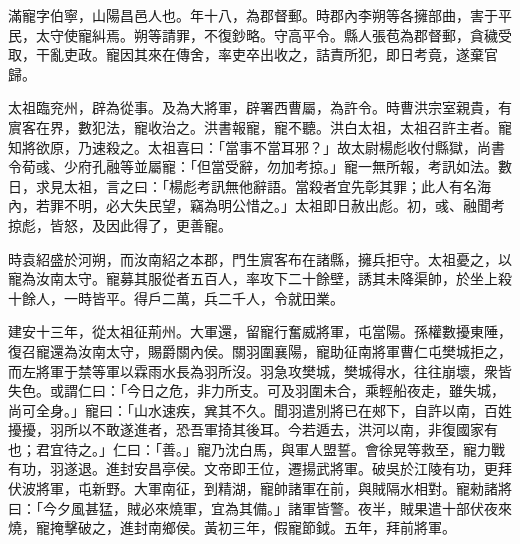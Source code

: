 \begin{pinyinscope}
 
 
 滿寵字伯寧，山陽昌邑人也。年十八，為郡督郵。時郡內李朔等各擁部曲，害于平民，太守使寵糾焉。朔等請罪，不復鈔略。守高平令。縣人張苞為郡督郵，貪穢受取，干亂吏政。寵因其來在傳舍，率吏卒出收之，詰責所犯，即日考竟，遂棄官歸。
 
 
 
 
 太祖臨兖州，辟為從事。及為大將軍，辟署西曹屬，為許令。時曹洪宗室親貴，有賔客在界，數犯法，寵收治之。洪書報寵，寵不聽。洪白太祖，太祖召許主者。寵知將欲原，乃速殺之。太祖喜曰：「當事不當耳邪？」故太尉楊彪收付縣獄，尚書令荀彧、少府孔融等並屬寵：「但當受辭，勿加考掠。」寵一無所報，考訊如法。數日，求見太祖，言之曰：「楊彪考訊無他辭語。當殺者宜先彰其罪；此人有名海內，若罪不明，必大失民望，竊為明公惜之。」太祖即日赦出彪。初，彧、融聞考掠彪，皆怒，及因此得了，更善寵。
 
 
 
 
 
 
 時袁紹盛於河朔，而汝南紹之本郡，門生賔客布在諸縣，擁兵拒守。太祖憂之，以寵為汝南太守。寵募其服從者五百人，率攻下二十餘壁，誘其未降渠帥，於坐上殺十餘人，一時皆平。得戶二萬，兵二千人，令就田業。
 
 
 
 
 建安十三年，從太祖征荊州。大軍還，留寵行奮威將軍，屯當陽。孫權數擾東陲，復召寵還為汝南太守，賜爵關內侯。關羽圍襄陽，寵助征南將軍曹仁屯樊城拒之，而左將軍于禁等軍以霖雨水長為羽所沒。羽急攻樊城，樊城得水，往往崩壞，衆皆失色。或謂仁曰：「今日之危，非力所支。可及羽圍未合，乘輕船夜走，雖失城，尚可全身。」寵曰：「山水速疾，兾其不久。聞羽遣別將已在郟下，自許以南，百姓擾擾，羽所以不敢遂進者，恐吾軍掎其後耳。今若遁去，洪河以南，非復國家有也；君宜待之。」仁曰：「善。」寵乃沈白馬，與軍人盟誓。會徐晃等救至，寵力戰有功，羽遂退。進封安昌亭侯。文帝即王位，遷揚武將軍。破吳於江陵有功，更拜伏波將軍，屯新野。大軍南征，到精湖，寵帥諸軍在前，與賊隔水相對。寵勑諸將曰：「今夕風甚猛，賊必來燒軍，宜為其備。」諸軍皆警。夜半，賊果遣十部伏夜來燒，寵掩擊破之，進封南鄉侯。黃初三年，假寵節鉞。五年，拜前將軍。
 

\end{pinyinscope}
